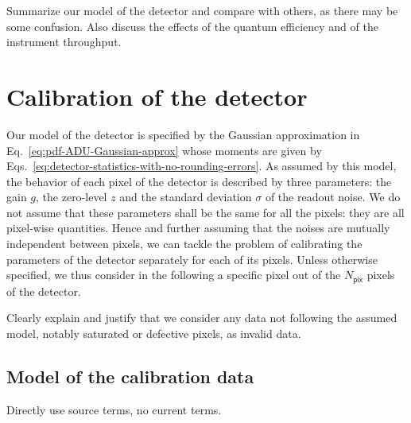 \documentclass{aa}
\newcommand{\oops}[1]{\textcolor[named]{OrangeRed1}{#1}}
\newcommand*{\Tag}[1]{\mathsf{#1}}
\begin{document}
\oops{Summarize our model of the detector and compare with others, as there may
be some confusion.  Also discuss the effects of the quantum efficiency and of
the instrument throughput.}


\section{Calibration of the detector}

Our model of the detector is specified by the Gaussian approximation in
Eq.~\eqref{eq:pdf-ADU-Gaussian-approx} whose moments are given by
Eqs.~\eqref{eq:detector-statistics-with-no-rounding-errors}.  As assumed by
this model, the behavior of each pixel of the detector is described by three
parameters: the gain $g$, the zero-level $z$ and the standard deviation
$\sigma$ of the readout noise.  We do not assume that these parameters shall be
the same for all the pixels: they are all pixel-wise quantities.  Hence and
further assuming that the noises are mutually independent between pixels, we
can tackle the problem of calibrating the parameters of the detector separately
for each of its pixels.  Unless otherwise specified, we thus consider in the
following a specific pixel out of the $N_\Tag{pix}$ pixels of the detector.

\oops{Clearly explain and justify that we consider any data not following the
  assumed model, notably saturated or defective pixels, as invalid data.}


\subsection{Model of the calibration data}


\oops{Directly use source terms, no current terms.}
\end{document}
